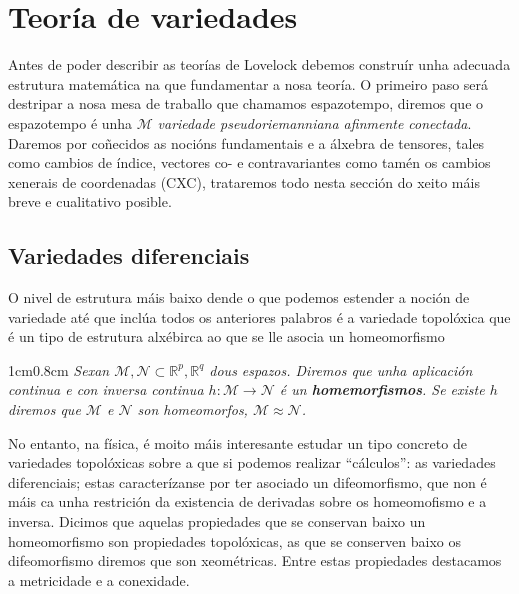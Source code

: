 \section{Teoría de variedades}
Antes de poder describir as teorías de Lovelock debemos construír unha adecuada estrutura matemática na que fundamentar a nosa teoría. O primeiro paso será destripar a nosa mesa de traballo que chamamos espazotempo, diremos que o espazotempo é unha $\mathcal{M}$ \textit{variedade pseudoriemanniana afinmente conectada}. Daremos por coñecidos as nocións fundamentais e a álxebra de tensores, tales como cambios de índice, vectores co- e contravariantes como tamén os cambios xenerais de coordenadas (CXC), trataremos todo nesta sección do xeito máis breve e cualitativo posible.

\subsection{Variedades diferenciais}
O nivel de estrutura máis baixo dende o que podemos estender a noción de variedade até que inclúa todos os anteriores palabros é a variedade topolóxica que é un tipo de estrutura alxébirca ao que se lle asocia un homeomorfismo \cite{masa-2020}
\begin{adjustwidth}{1cm}{0.8cm}\vspace{0.4em}
    \textit{Sexan $\mathcal{M},\mathcal{N}\subset\mathbb{R}^p,\mathbb{R}^q$ dous espazos. Diremos que unha aplicación continua e con inversa continua $h:\mathcal{M}\longrightarrow\mathcal{N}$ é un \textbf{homemorfismos}. Se existe $h$ diremos que $\mathcal{M}$ e $\mathcal{N}$ son homeomorfos, $\mathcal{M}\approx\mathcal{N}$.}\vspace{0.4em}
\end{adjustwidth}
No entanto, na física, é moito máis interesante estudar un tipo concreto de variedades topolóxicas sobre a que si podemos realizar ``cálculos'': as variedades diferenciais; estas caracterízanse por ter asociado un difeomorfismo, que non é máis ca unha restrición da existencia de derivadas sobre os homeomofismo e a inversa. Dicimos que aquelas propiedades que se conservan baixo un homeomorfismo son propiedades topolóxicas, as que se conserven baixo os difeomorfismo diremos que son xeométricas. Entre estas propiedades destacamos a metricidade e a conexidade.


